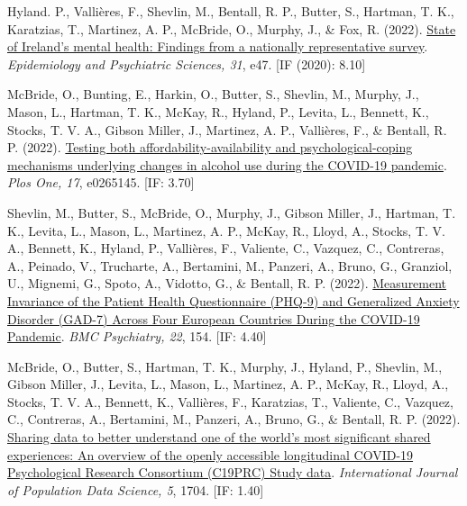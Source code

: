 \documentclass[12pt]{article}
\begin{document}
\begin{bibenum}
\item Hyland. P., Vallières, F., Shevlin, M., 
		Bentall, R. P., Butter, S., Hartman, T. K.,
		Karatzias, T., Martinez, A. P., McBride, O.,
		Murphy, J., \& Fox, R. (2022). 
		\href{https://doi.org/10.1017/S2045796022000312}
		{State of Ireland's mental health: Findings 
		from a nationally representative survey}. 
		\emph{Epidemiology and Psychiatric Sciences, 31}, 
		e47. [IF (2020): 8.10]

\item McBride, O., Bunting, E., Harkin, O., 
		Butter, S.,  Shevlin, M., Murphy, J., 
		Mason, L., Hartman, T. K., McKay, R., Hyland, P., 
		Levita, L.,  Bennett, K., Stocks, T. V. A., 
		Gibson Miller, J., Martinez, A. P., 
		Vallières, F., \& Bentall, R. P. (2022).
		\href{https://doi.org/10.1371/journal.pone.0265145}
		{Testing both affordability-availability 
		and psychological-coping mechanisms 
		underlying changes in alcohol use during 
		the COVID-19 pandemic}.
		\emph{Plos One, 17}, e0265145. [IF: 3.70]

\item Shevlin, M., Butter, S., McBride, O., 
		Murphy, J., Gibson Miller, J., 
		Hartman, T. K., Levita, L., Mason, L., 
		Martinez, A. P., McKay, R., Lloyd, A., 
		Stocks, T. V. A., Bennett, K., Hyland, P., 
		Vallières, F., Valiente, C., Vazquez, C., 
		Contreras, A., Peinado, V., Trucharte, A., 
		Bertamini, M., Panzeri, A., Bruno, G., 
		Granziol, U., Mignemi, G., Spoto, A., 
		Vidotto, G., \& Bentall, R. P. (2022).
		\href{https://doi.org/10.1186/s12888-022-03787-5}
		{Measurement Invariance of the Patient Health 
		Questionnaire (PHQ-9) and Generalized Anxiety 
		Disorder (GAD-7) Across Four European 
		Countries During the COVID-19 Pandemic}. 
		\emph{BMC Psychiatry, 22}, 154. [IF: 4.40]
		
\item McBride, O., Butter, S., 
		Hartman, T. K., Murphy, J., Hyland, P., 
		Shevlin, M., Gibson Miller, J., 
		Levita, L., Mason, L., Martinez, A. P., 
		McKay, R., Lloyd, A., Stocks, T. V. A., 
		Bennett, K., Vallières, F., Karatzias, T., 
		Valiente, C., Vazquez, C., Contreras, A., 
		Bertamini, M., Panzeri, A., Bruno, G., 
		\& Bentall, R. P. (2022). 
		\href{https://doi.org/10.23889/ijpds.v5i4.1704}
		{Sharing data to better understand one of 
		the world’s most significant shared 
		experiences: An overview of the openly 
		accessible longitudinal COVID-19 
		Psychological Research Consortium 
		(C19PRC) Study data}. 
		\emph{International Journal of Population 
		Data Science, 5}, 1704. [IF: 1.40]
		

\end{bibenum}
\end{document}
